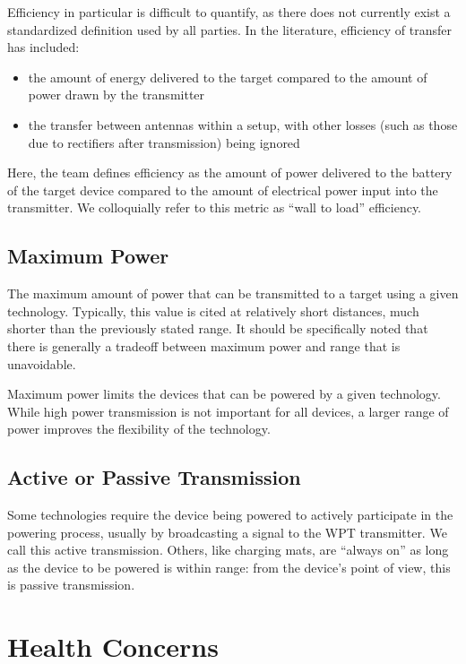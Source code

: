 Efficiency in particular is difficult to quantify, as there does not currently exist a standardized definition used by all parties. In the literature, efficiency of transfer has included:
\begin{itemize}
    \item the amount of energy delivered to the target compared to the amount of power drawn by the transmitter
    \item the transfer between antennas within a setup, with other losses (such as those due to rectifiers after transmission) being ignored
\end{itemize}

Here, the team defines efficiency as the amount of power delivered to the battery of the target device compared to the amount of electrical power input into the transmitter. We colloquially refer to this metric as ``wall to load'' efficiency.

\subsection{Maximum Power}

The maximum amount of power that can be transmitted to a target using a given technology. Typically, this value is cited at relatively short distances, much shorter than the previously stated range. It should be specifically noted that there is generally a tradeoff between maximum power and range that is unavoidable.

Maximum power limits the devices that can be powered by a given technology. While high power transmission is not important for all devices, a larger range of power improves the flexibility of the technology.

\subsection{Active or Passive Transmission}

Some technologies require the device being powered to actively participate in the powering process, usually by broadcasting a signal to the WPT transmitter. We call this active transmission. Others, like charging mats, are ``always on'' as long as the device to be powered is within range: from the device's point of view, this is passive transmission.

\section{Health Concerns}

